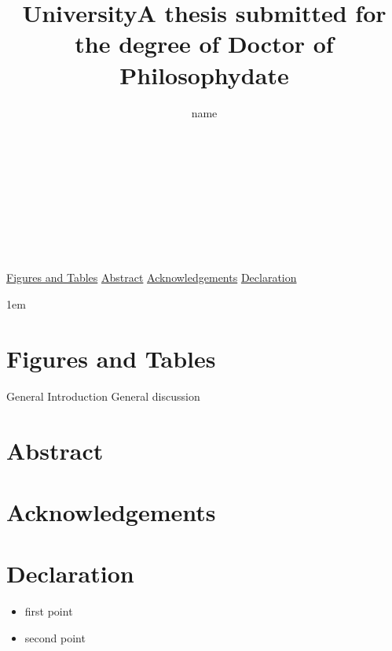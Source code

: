 \begin{center}
\vspace{10mm} %
\large
\author{name} \\    %
\vspace{5mm} %
\title{University} \\
\vspace{20mm} %
\title{A thesis submitted for the degree of Doctor of Philosophy} \\ 
\vspace{5mm} %
\title{date} \\
\end{center}
\newpage




\tableofcontents
\hyperref[sec:FT]{Figures and Tables}
\hyperref[sec:Abs]{Abstract}
\hyperref[sec:Ack]{Acknowledgements}
\hyperref[sec:Dec]{Declaration}


\openup 1em %
\newpage

\section{Figures and Tables}
\label{sec:FT}
\listoffigures
General Introduction 
General discussion
\listoftables
\newpage

\section{Abstract}
\label{sec:Abs}


\newpage

\section{Acknowledgements}
\label{sec:Ack}


\newpage
 
\section{Declaration}
\label{sec:Dec}


\begin{itemize}
\vspace{2mm} %
\item first point

\item second point

\vspace{2mm} %

\end{itemize}

